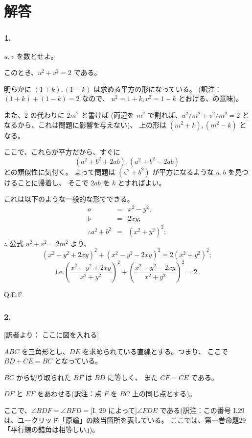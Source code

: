 
\chapter{解答}

\subsection*{1.}

 $u, v$ を数とせよ。

このとき、$u^2 + v^2 = 2$ である。

明らかに $(1 + k), (1 - k)$ は求める平方の形になっている。
(訳注： $(1 + k) + (1 - k) = 2$ なので、
$u^2 = 1 + k, v^2 = 1 - k$ とおける、の意味)。

また、2 の代わりに $2 m^2$ と書けば
(両辺を $m^2$ で割れば、$u^2/m^2 + v^2/m^2 = 2$
となるから、これは問題に影響を与えない)、
上の形は $(m^2 + k), (m^2 - k)$ となる。

ここで、これらが平方だから、すぐに
\[
(a^2 + b^2 + 2ab), (a^2 + b^2 - 2ab)
\]
との類似性に気付く。
よって問題は $(a^2 + b^2)$ が平方になるような
$a, b$ を見つけることに帰着し、
そこで $2ab$ を $k$  とすればよい。

これは以下のような一般的な形でできる。
\begin{eqnarray*}
a &=& x^2 - y^2,\\
b &=& 2xy;\\
\therefore a^2 + b^2 &=& (x^2 + y^2)^2;
\end{eqnarray*}
$\therefore$ 公式 $u^2 + v^2 = 2m^2$ より、
\[
(x^2 - y^2 + 2xy)^2 + (x^2 - y^2 - 2xy)^2 = 2(x^2 + y^2)^2;
\]
\[
\mbox{i.e.}
\left( \frac{x^2 - y^2 + 2xy}{x^2 + y^2}\right)^2
+ \left( \frac{x^2 - y^2 - 2xy}{x^2 + y^2}\right)^2
= 2.
\]

Q.E.F.

\subsection*{2.}

[訳者より： ここに図を入れる]

$ABC$ を三角形とし、$DE$ を求められている直線とする。つまり、
ここで $BD + CE = BC$ となっている。

$BC$ から切り取られた $BF$ は $BD$ に等しく、
また $CF = CE$ である。

$DF$ と $EF$ をあわせる(訳注：点 $F$ を $BC$ 上の同じ点とする)。

ここで、$\angle BDF = \angle BFD = \mbox{[I. 29 によって]} \angle FDE$
である(訳注：この番号 I.29 は、ユークリッド「原論」の該当箇所を表している。
ここでは、第一巻命題29「平行線の錯角は相等しい」)。

